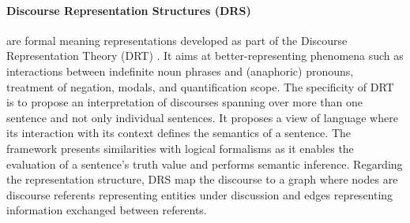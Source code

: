 \paragraph{Discourse Representation Structures (DRS)} are formal meaning representations developed as part of the Discourse Representation Theory (DRT) \parencite{kamp1993discourse}. It aims at better-representing phenomena such as interactions between indefinite noun phrases and (anaphoric) pronouns, treatment of negation, modals, and quantification scope. The specificity of DRT is to propose an interpretation of discourses spanning over more than one sentence and not only individual sentences. It proposes a view of language where its interaction with its context defines the semantics of a sentence. The framework presents similarities with logical formalisms as it enables the evaluation of a sentence's truth value and performs semantic inference. Regarding the representation structure, DRS map the discourse to a graph where nodes are discourse referents representing entities under discussion and edges representing information exchanged between referents.


